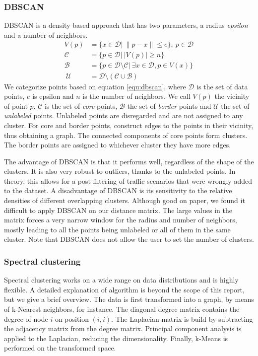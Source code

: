 \documentclass[conference]{IEEEtran}
\begin{document}
\subsubsection{DBSCAN}
DBSCAN is a density based approach that has two parameters, a radius \emph{epsilon} and a number of neighbors.
\begin{equation}\label{equ:dbscan}
\begin{split}
V(p) & =\{ x \in \mathcal{D} | \ \lVert p - x \rVert \leq e\}, \ p \in \mathcal{D} \\
\mathcal{C} & = \{ p \in \mathcal{D} | \ \left| V(p) \right| \geq n \} \\
\mathcal{B} & = \{ p \in \mathcal{D} \setminus \mathcal{C} | \ \exists x \in \mathcal{D}, p \in V(x) \} \\\
\mathcal{U} & = \mathcal{D} \setminus (\mathcal{C} \cup \mathcal{B})
\end{split}
\end{equation}
We categorize points based on equation \ref{equ:dbscan}, where $\mathcal{D}$ is the set of data points, $e$ is epsilon and $n$ is the number of neighbors. We call $V(p)$ the vicinity of point $p$. $\mathcal{C}$ is the set of \emph{core} points, $\mathcal{B}$ the set of \emph{border} points and $\mathcal{U}$ the set of \emph{unlabeled} points. Unlabeled points are disregarded and are not assigned to any cluster. For core and border points, construct edges to the points in their vicinity, thus obtaining a graph. The connected components of core points form clusters. The border points are assigned to whichever cluster they have more edges.

The advantage of DBSCAN is that it performs well, regardless of the shape of the clusters. It is also very robust to outliers, thanks to the unlabeled points. In theory, this allows for a post filtering of traffic scenarios that were wrongly added to the dataset. A disadvantage of DBSCAN is its sensitivity to the relative densities of different overlapping clusters. Although good on paper, we found it difficult to apply DBSCAN on our distance matrix. The large values in the matrix forces a very narrow window for the radius and number of neighbors, mostly leading to all the points being unlabeled or all of them in the same cluster. Note that DBSCAN does not allow the user to set the number of clusters.

\subsubsection{Spectral clustering}
Spectral clustering works on a wide range on data distributions and is highly flexible. A detailed explanation of algorithm is beyond the scope of this report, but we give a brief overview. The data is first transformed into a graph, by means of k-Nearest neighbors, for instance. The diagonal degree matrix contains the degree of node $i$ on position $(i,i)$. The Laplacian matrix is build by subtracting the adjacency matrix from the degree matrix. Principal component analysis is applied to the Laplacian, reducing the dimensionality. Finally, k-Means is performed on the transformed space.
\end{document}
